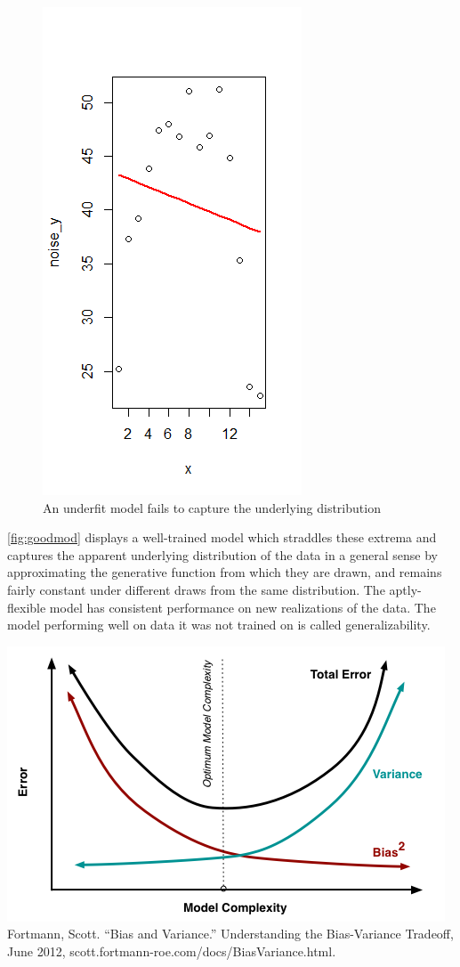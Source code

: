 \documentclass[12pt,twoside]{reedthesis}
\begin{document}
\begin{figure}
\centering
\includegraphics{figure/underfit.png}
\caption{\label{fig:underfit}An underfit model fails to capture the
underlying distribution}
\end{figure}
\ref{fig:goodmod} displays a well-trained model which straddles these
extrema and captures the apparent underlying distribution of the data in
a general sense by approximating the generative function from which they
are drawn, and remains fairly constant under different draws from the
same distribution. The aptly-flexible model has consistent performance
on new realizations of the data. The model performing well on data it
was not trained on is called generalizability.

\includegraphics{figure/biasvariance.png} Fortmann, Scott. ``Bias and
Variance.'' Understanding the Bias-Variance Tradeoff, June 2012,
scott.fortmann-roe.com/docs/BiasVariance.html.
\end{document}
